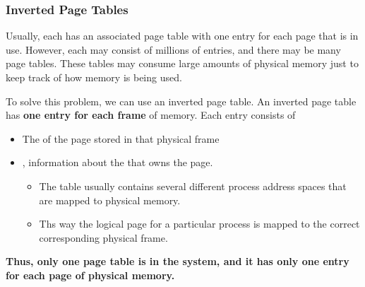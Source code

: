 \subsubsection{Inverted Page Tables}\label{subsubsec:Inverted_Page_Tables}
Usually, each  has an associated page table with one entry for each page that is in use.
However, each  may consist of millions of entries, and there may be many page tables.
These tables may consume large amounts of physical memory just to keep track of how memory is being used.

To solve this problem, we can use an inverted page table.
An inverted page table has \textbf{one entry for each frame} of memory.
Each entry consists of
\begin{itemize}[noitemsep]
\item The  of the page stored in that physical frame
\item {}, information about the  that owns the page.
  \begin{itemize}[noitemsep]
  \item The table usually contains several different process address spaces that are mapped to physical memory.
  \item Ths way the logical page for a particular process is mapped to the correct corresponding physical frame.
  \end{itemize}
\end{itemize}

\begin{blackbox}
  {\large{\textbf{Thus, only one page table is in the system, and it has only one entry for each page of physical memory.}}}
\end{blackbox}


